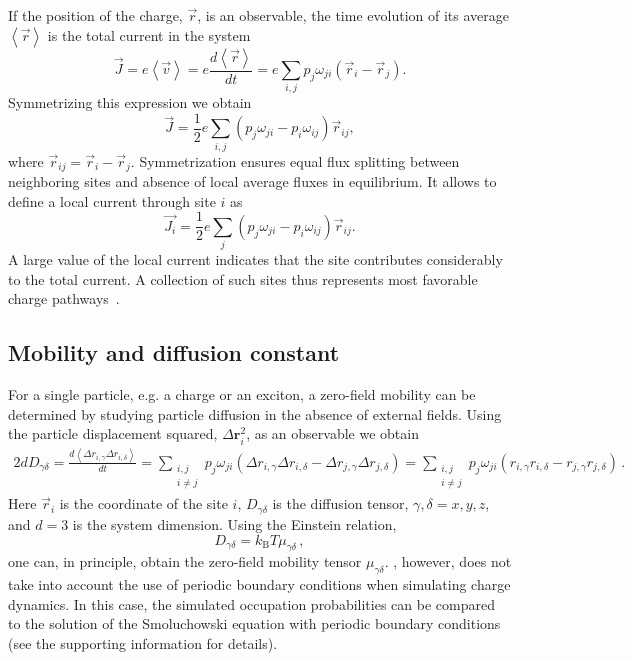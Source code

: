 If the position of the charge, $\vec{r}$, is an observable, the time evolution of its average $\left<\vec{r}\right>$ is the total current in the system
\begin{equation}
 \vec{J} = e \left< \vec{v} \right> = e \frac{d \left< \vec{r}
   \right>} {dt} = e \sum_{i, j} p_{j} \omega_{ji} ( \vec{r}_i -
 \vec{r}_j ) .
\label{equ:current_def}
\end{equation}
Symmetrizing this expression we obtain
\begin{equation}
  \vec{J} = \frac{1}{2} e \sum_{i, j} \left( p_{j} 
  \omega_{ji} - p_{i} \omega_{ij} \right) \vec{r}_{ij} ,
 \label{equ:current}
\end{equation}
where $\vec{r}_{ij} = \vec{r}_{i} - \vec{r}_{j}$. Symmetrization ensures equal flux
splitting between neighboring sites and absence of local average fluxes in equilibrium. It allows to define a local current through site $i$ as
\begin{equation}
  \vec{J_i} = \frac{1}{2} e \sum_{ j} \left( p_{j}  \omega_{ji} - p_{i} \omega_{ij} \right) \vec{r}_{ij} .
 \label{equ:site_current}
\end{equation}
A large value of the local current indicates that the site contributes considerably to the total current. A collection of such sites thus represents most favorable charge pathways~\cite{van_der_holst_modeling_2009}.

\subsection{Mobility and diffusion constant}
For a single particle, e.g. a charge or an exciton, a zero-field mobility can be determined by studying particle diffusion in the absence of external fields. Using the particle displacement squared, $\Delta {\bm r}_i^2$, as an observable  we obtain
 \begin{equation}
\begin{split}
2d D_{\gamma \delta} =  \frac{d \left<  \Delta{r}_{i, \gamma} \Delta{r}_{i, \delta} \right>}{dt} 
= \sum_{\substack{i,j \\ i\ne j}} p_j\omega_{ji} 
 \left( \Delta r_{i,\gamma}\Delta r_{i,\delta} - \Delta r_{j,\gamma}\Delta r_{j,\delta} \right)  
= \sum_{\substack{i,j\\ i\ne j}} p_j \omega_{ji} \left( r_{i,\gamma} r_{i,\delta} - r_{j,\gamma} r_{j,\delta} \right) \, .
\end{split}
\label{equ:diffusion}
\end{equation}
Here $\vec{r}_i$ is the coordinate of the site $i$, $D_{\gamma \delta}$ is the diffusion tensor, $\gamma, \delta = x,y,z$, and $d=3$ is the system dimension. Using the Einstein relation, 
\begin{equation}
 D_{\gamma \delta} = k_\text{B}T \mu_{\gamma \delta} \, ,
\end{equation}
one can, in principle, obtain the zero-field mobility tensor $\mu_{\gamma \delta}$. , however, does not take into account the use of periodic boundary conditions when simulating charge dynamics. In this case, the simulated occupation probabilities can be compared to the solution of the Smoluchowski equation with periodic boundary conditions  (see the supporting information for details). 

